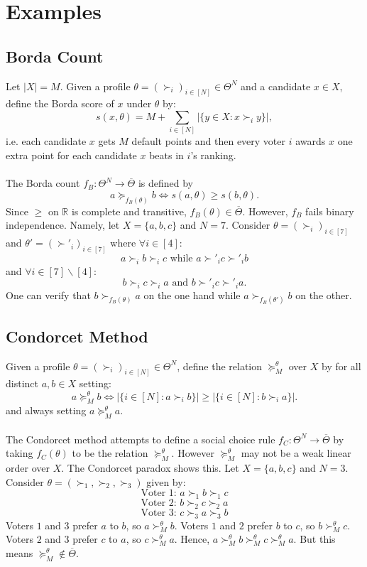 \documentclass[11pt]{article}
\theoremstyle{definition}
\theoremstyle{plain}
\begin{document}
\section{Examples}
\subsection*{Borda Count}

Let $|X|=M$. Given a profile $\theta=(\succ_i)_{i \in [N]} \in \Theta^N$ and a candidate $x \in X$, define the Borda score of $x$ under $\theta$ by:
$$s(x,\theta) = M+\sum_{i \in [N]} \big|\{y \in X : x \succ_i y\}\big|,$$
i.e. each candidate $x$ gets $M$ default points and then every voter $i$ awards $x$ one extra point for each candidate $x$ beats in $i$'s ranking.
\\
\\
The Borda count $f_B: \Theta^N \to \overline{\Theta}$ is defined by
$$a \succeq_{f_B(\theta)} b \iff s(a,\theta) \ge s(b,\theta).$$
Since $\ge$ on $\mathbb{R}$ is complete and transitive, $f_B(\theta) \in \overline{\Theta}$. However, $f_B$ fails binary independence. Namely, let $X=\{a,b,c\}$ and $N=7$. Consider $\theta=(\succ_i)_{i \in [7]}$ and $\theta'=(\succ'_i)_{i \in [7]}$ where $\forall i \in[4]$:
$$a \succ_i b \succ_i c \text{ while } a \succ'_i c \succ'_i b$$
and $\forall i \in[7] \backslash[4]$:
$$b \succ_i c \succ_i a \text{ and } b \succ'_i c \succ'_i a.$$
One can verify that $b \succ_{f_B(\theta)} a$ on the one hand while $a \succ_{f_B(\theta')} b$ on the other.
\subsection*{Condorcet Method}

Given a profile $\theta=(\succ_i)_{i\in[N]} \in \Theta^N$, define the relation $\succeq_M^\theta$ over $X$ by for all distinct $a,b \in X$ setting:
$$a \succeq_M^\theta b \iff \big|\{i \in [N] : a \succ_i b\}\big| \geq \big|\{i \in [N]: b \succ_i a\}\big|.$$
and always setting $a \succeq_M^{\theta}a$.
\\
\\
The Condorcet method attempts to define a social choice rule $f_C: \Theta^N \to \overline{\Theta}$ by taking $f_C(\theta)$ to be the relation $\succeq_M^\theta$. However $\succeq_M^\theta$ may not be a weak linear order over $X$. The Condorcet paradox shows this. Let $X=\{a,b,c\}$ and $N=3$. Consider $\theta=(\succ_1,\succ_2,\succ_3)$ given by:
$$\text{Voter 1: } a \succ_1 b \succ_1 c$$
$$\text{Voter 2: } b \succ_2 c \succ_2 a$$
$$\text{Voter 3: } c \succ_3 a \succ_3 b$$
Voters $1$ and $3$ prefer $a$ to $b$, so $a \succ_M^\theta b$. Voters $1$ and $2$ prefer $b$ to $c$, so $b \succ_M^\theta c$. Voters $2$ and $3$ prefer $c$ to $a$, so $c \succ_M^\theta a$. Hence, $a \succ_M^\theta b \succ_M^\theta c \succ_M^\theta a$. But this means $\succeq_M^\theta \notin \overline{\Theta}$.
\end{document}
